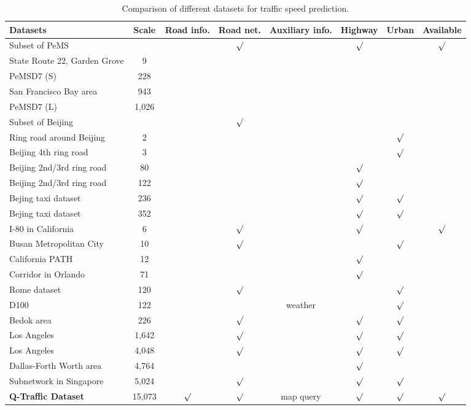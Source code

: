 \begin{table*}[htbp]
\caption{Comparison of different datasets for traffic speed prediction.}
\label{tab:cmpdatasets}

\begin{tabular}{lccccccc}
\toprule
Datasets & Scale & Road info. & Road net. & Auxiliary info. & Highway & Urban & Available\tabularnewline
\midrule
Subset of PeMS &  &  & \multirow{5}{*}{$\surd$} &  & \multirow{5}{*}{$\surd$} &  & \multirow{5}{*}{$\surd$}\tabularnewline
State Route 22, Garden Grove \cite{yang2017ensemble} & 9 &  &  &  &  &  & \tabularnewline
PeMSD7 (S) \cite{yu2017spatio} & 228 &  &  &  &  &  & \tabularnewline
San Francisco Bay area \cite{he2013improving} & 943 &  &  &  &  &  & \tabularnewline
PeMSD7 (L) \cite{yu2017spatio} & 1,026 &  &  &  &  &  & \tabularnewline
\midrule
Subset of Beijing &  &  & \multirow{7}{*}{$\surd$} &  &  &  & \tabularnewline
Ring road around Beijing \cite{ma2015long} & 2 &  &  &  &  & $\surd$ & \tabularnewline
Beijing 4th ring road \cite{tang2017improved}  & 3 &  &  &  &  & $\surd$ & \tabularnewline
Beijing 2nd/3rd ring road  \cite{wang2016traffic} & 80 &  &  &  & $\surd$ &  & \tabularnewline
Beijing 2nd/3rd ring road \cite{wang2016traffic} & 122 &  &  &  & $\surd$ &  & \tabularnewline
Bejing taxi dataset \cite{ma2017learning} & 236 &  &  &  & $\surd$ & $\surd$ & \tabularnewline
Bejing taxi dataset \cite{ma2017learning} & 352 &  &  &  & $\surd$ & $\surd$ & \tabularnewline
\midrule
I-80 in California \cite{duan2016starima} & 6 &  & $\surd$ &  & $\surd$ &  & $\surd$\tabularnewline
Busan Metropolitan City \cite{kim2016comparison} & 10 &  & $\surd$ &  &  & $\surd$ & \tabularnewline
California PATH \cite{bezuglov2016short} & 12 &  &  &  & $\surd$ &  & \tabularnewline
Corridor in Orlando \cite{qi2014hidden} & 71 &  &  &  & $\surd$ &  & \tabularnewline
Rome dataset \cite{fusco2016short} & 120 &  & $\surd$ &  &  & $\surd$ & \tabularnewline
D100 \cite{gulaccar2016short} & 122 &  &  & weather &  & $\surd$ & \tabularnewline
Bedok area \cite{dauwels2014predicting} & 226 &  & $\surd$ &  & $\surd$ & $\surd$ & \tabularnewline
Los Angeles \cite{deng2016latent} & 1,642 &  & $\surd$ &  & $\surd$ & $\surd$ & \tabularnewline
Los Angeles \cite{deng2016latent} & 4,048 &  & $\surd$ &  & $\surd$ & $\surd$ & \tabularnewline
Dallas-Forth Worth area \cite{hasanzadeh2017graph} & 4,764 &  &  &  & $\surd$ &  & \tabularnewline
Subnetwork in Singapore \cite{asif2014spatiotemporal} & 5,024 &  & $\surd$ &  & $\surd$ & $\surd$ & \tabularnewline
\midrule
\textbf{Q-Traffic Dataset} & 15,073 & $\surd$ & $\surd$ & map query & $\surd$ & $\surd$ & $\surd$\tabularnewline
\toprule
\end{tabular}

\end{table*}


